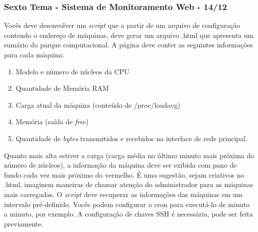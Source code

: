 \documentclass{beamer}
\begin{document}
   \begin{frame}
      \frametitle{Sexto Tema - Sistema de Monitoramento Web - 14/12}
      \scriptsize
      Vocês deve desenvolver um \textit{script} que a partir de um arquivo de configuração contendo o endereço de máquinas, deve gerar um arquivo .html que apresenta um sumário do parque computacional. A página deve conter as seguintes informações para cada máquina:
     \begin{enumerate}
         \item Modelo e número de núcleos da CPU
         \item Quantidade de Memória RAM
         \item Carga atual da máquina (conteúdo de /proc/loadavg)
	 \item Memória (saída de \textit{free})
	 \item Quantidade de \textit{bytes} transmitidos e recebidos na interface de rede principal.
     \end{enumerate}
     Quanto mais alta estiver a carga (carga média no último minuto mais próxima do número de núcleos), a informação da máquina deve ser exibida com pano de fundo cada vez mais próximo do vermelho. É uma sugestão, sejam criativos no .html, imaginem maneiras de chamar atenção do administrador para as máquinas mais carregadas. O \textit{script} deve recuperar as informações das máquinas em um intervalo pré-definido. Vocês podem configurar o cron para executá-lo de minuto a minuto, por exemplo. A configuração de chaves SSH é necessária, pode ser feita previamente.
   \end{frame}
\end{document}
